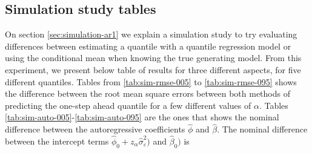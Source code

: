 







\subsection{Simulation study tables}
\label{sec:simulation-tables}

On section \ref{sec:simulation-ar1} we explain a simulation study to try evaluating differences between estimating a quantile with a quantile regression model or using the conditional mean when knowing the true generating model. From this experiment, we present below table of results for three different aspects, for five different quantiles. Tables from \ref{tab:sim-rmse-005} to \ref{tab:sim-rmse-095}  shows the difference between the root mean square errors between both methods of predicting the one-step ahead quantile for a few different values of $\alpha$. Tables \ref{tab:sim-auto-005}-\ref{tab:sim-auto-095} are the ones that shows the nominal difference between the autoregressive coefficients $\hat{\phi}$ and $\hat{\beta}$. The nominal difference between the intercept terms $\hat{\phi}_0 + z_\alpha  \hat{\sigma}^2_\varepsilon)$ and $\hat{\beta}_0)$ is 














\clearpage


